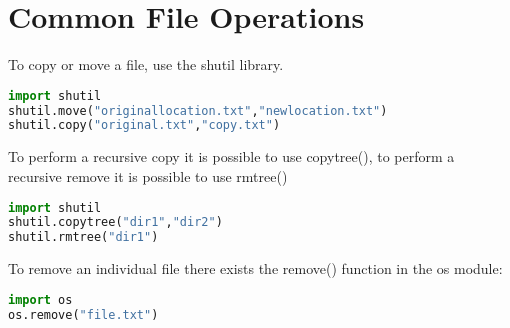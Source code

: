 \section{Common File Operations}
To copy or move a file, use the shutil library.
\lstset{basicstyle=\scriptsize, numbers=left, captionpos=b, tabsize=4}
\begin{lstlisting}[caption=Copy File,language={Python},
xleftmargin=15pt, label=lst:copyfile]
import shutil
shutil.move("originallocation.txt","newlocation.txt")
shutil.copy("original.txt","copy.txt")
\end{lstlisting}

To perform a recursive copy it is possible to use copytree(), to perform a
recursive remove it is possible to use rmtree()
\lstset{basicstyle=\scriptsize, numbers=left, captionpos=b, tabsize=4}
\begin{lstlisting}[caption=Recursive File handling,language={Python},
xleftmargin=15pt, label=lst:recursivefilehandling]
import shutil
shutil.copytree("dir1","dir2")
shutil.rmtree("dir1")
\end{lstlisting}

To remove an individual file there exists the remove() function in the os
module:
\lstset{basicstyle=\scriptsize, numbers=left, captionpos=b, tabsize=4}
\begin{lstlisting}[caption=Remove File,language={Python},
xleftmargin=15pt, label=lst:removefile]
import os
os.remove("file.txt")
\end{lstlisting}
